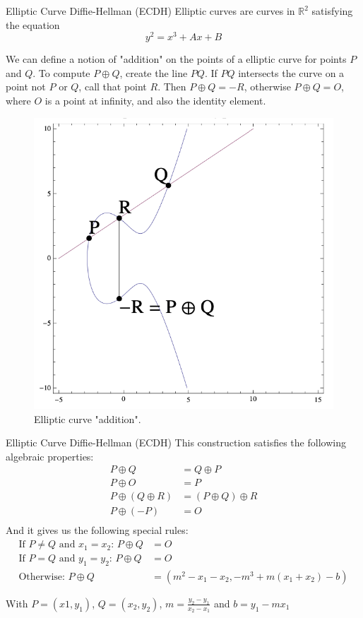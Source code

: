 \documentclass{beamer}
\begin{document}
\begin{frame}{Elliptic Curve Diffie-Hellman (ECDH)}
    Elliptic curves are curves in $\mathbb{R}^2$ satisfying the equation
    \[
        y^2 = x^3 + Ax + B
    \]

    We can define a notion of "addition" on the points of a elliptic curve for points $P$ and $Q$. To compute $P \oplus Q$, create the line $PQ$. If $PQ$ intersects the curve on a point not $P$ or $Q$, call that point $R$. Then $P \oplus Q = - R$, otherwise $P \oplus Q = O$, where $O$ is a point at infinity, and also the identity element.
    \begin{figure}
        \centering
        \includegraphics[width=0.3\linewidth]{figures/ec_addition.png}
        \caption{Elliptic curve "addition".}
        \label{fig:enter-label}
    \end{figure}

    
\end{frame}

\begin{frame}{Elliptic Curve Diffie-Hellman (ECDH)}
    This construction satisfies the following algebraic properties:
    \[
    \begin{split}
        \scriptstyle P \oplus Q & \scriptstyle = Q \oplus P \\
        \scriptstyle P \oplus O & \scriptstyle = P \\
        \scriptstyle P \oplus (Q \oplus R) & \scriptstyle = (P \oplus Q) \oplus R \\
        \scriptstyle P \oplus (-P) & \scriptstyle = O \\
    \end{split}
    \]
    And it gives us the following special rules:
    \[
    \begin{split}
        \scriptstyle \text{If } P \neq Q \text{ and } x_1 = x_2 \text{: } P \oplus Q & \scriptstyle = O \\
        \scriptstyle \text{If } P = Q \text{ and } y_1 = y_2 \text{: } P \oplus Q & \scriptstyle = O \\
        \scriptstyle \text{Otherwise: } P \oplus Q & \scriptstyle {= (m^2 - x_1 - x_2, -m^3+m(x_1+x_2)-b)}
    \end{split}
    \]

    {\scriptsize With $P = (x1, y_1)$, $Q = (x_2, y_2)$, $m = \frac{y_2 - y_1}{x_2 - x_1}$ and $b = y_1 - mx_1$}
\end{frame}
\end{document}
